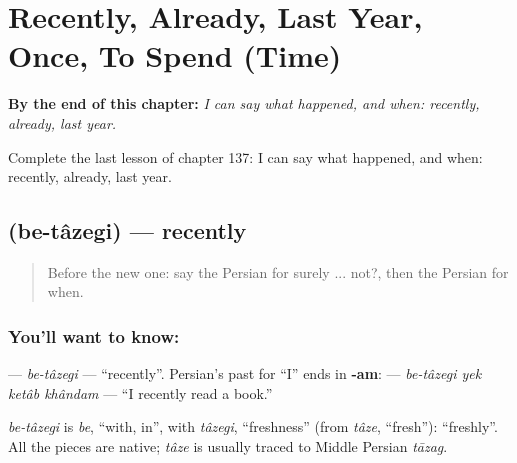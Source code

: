 
\chapter{Recently, Already, Last Year, Once, To Spend (Time)}
\label{ch:fa-recently-already-last-year-once-to-spend-time}

\begin{chapteropening}
\textbf{By the end of this chapter:} \emph{I can say what happened, and when: recently, already, last year.}

Complete the last lesson of chapter 137: I can say what happened, and when: recently, already, last year.
\end{chapteropening}

\section[\texorpdfstring{\fa{به} \fa{تازگی} (be-tâzegi)}{به تازگی (be-tâzegi)}]{  (be-tâzegi) — recently}

\label{lesson:FA-C137-be-tazegi}



\begin{quote}
Before the new one: say the Persian for surely ... not?, then the Persian for when.
\end{quote}

\subsection*{You'll want to know:  }
\textbf{ } — \emph{be-tâzegi} — \textquotedblleft{}recently\textquotedblright{}. Persian's past for \textquotedblleft{}I\textquotedblright{} ends in \textbf{-am}: \textbf{    } — \emph{be-tâzegi yek ketâb khândam} — \textquotedblleft{}I recently read a book.\textquotedblright{}

\begin{cousinweb}
\emph{be-tâzegi} is \emph{be}, \textquotedblleft{}with, in\textquotedblright{}, with \emph{tâzegi}, \textquotedblleft{}freshness\textquotedblright{} (from \emph{tâze}, \textquotedblleft{}fresh\textquotedblright{}): \textquotedblleft{}freshly\textquotedblright{}. All the pieces are native; \emph{tâze} is usually traced to Middle Persian \emph{tāzag}.
\end{cousinweb}

